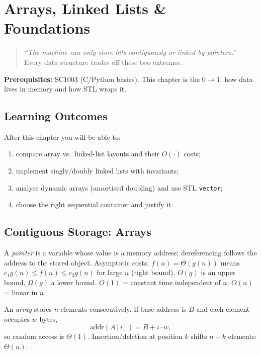\chapter{Arrays, Linked Lists \& Foundations}
\label{ch:stl-foundations}

\begin{quote}
\emph{``The machine can only store bits contiguously or linked by pointers.''} --- Every data structure trades off these two extremes.
\end{quote}

\noindent\textbf{Prerequisites:} SC1003 (C/Python basics). This chapter is the 0$\to$1: how data lives in memory and how STL wraps it.

\section*{Learning Outcomes}
After this chapter you will be able to:
\begin{enumerate}[label=(L\arabic*)]
    \item compare array vs.\ linked-list layouts and their $O(\cdot)$ costs;
    \item implement singly/doubly linked lists with invariants;
    \item analyse dynamic arrays (amortised doubling) and use STL \texttt{vector};
    \item choose the right sequential container and justify it.
\end{enumerate}

\section{Contiguous Storage: Arrays}
\label{sec:arrays}
A \emph{pointer} is a variable whose value is a memory address; dereferencing follows the address to the stored object. Asymptotic costs: $f(n)=\Theta(g(n))$ means $c_{1}g(n)\le f(n)\le c_{2}g(n)$ for large $n$ (tight bound), $O(g)$ is an upper bound, $\Omega(g)$ a lower bound. $O(1)$ = constant time independent of $n$; $O(n)$ = linear in $n$.

An \emph{array} stores $n$ elements consecutively. If base address is $B$ and each element occupies $w$ bytes,
\begin{equation}
\text{addr}(A[i]) = B + i\cdot w,
\label{eq:array-addr}
\end{equation}
so random access is $\Theta(1)$. Insertion/deletion at position $k$ shifts $n-k$ elements: $\Theta(n)$.

